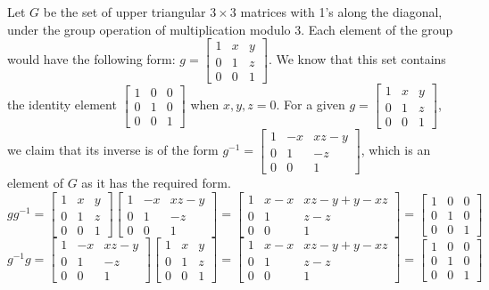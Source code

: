 \documentclass[12pt,letterpaper,reqno]{amsart}
\begin{document}
\begin{enumerate}
\begin{flushleft}
Let $G$ be the set of upper triangular $3 \times 3$ matrices with 1's along the diagonal, under the group operation of multiplication modulo 3. Each element of the group would have the following form: $g = \begin{bmatrix} 1 & x & y \\0 & 1 & z\\ 0 & 0 & 1 \end{bmatrix}$. We know that this set contains the identity element $\begin{bmatrix} 1 & 0 & 0 \\0 & 1 & 0\\ 0 & 0 & 1 \end{bmatrix}$ when $x, y, z = 0$.
\newline
For a given $g = \begin{bmatrix} 1 & x & y \\0 & 1 & z\\ 0 & 0 & 1 \end{bmatrix}$, we claim that its inverse is of the form $g^{-1} = \begin{bmatrix} 1 & -x & xz-y \\0 & 1 & -z\\ 0 & 0 & 1 \end{bmatrix}$, which is an element of $G$ as it has the required form.
$$gg^{-1} = \begin{bmatrix} 1 & x & y \\0 & 1 & z\\ 0 & 0 & 1 \end{bmatrix}\begin{bmatrix} 1 & -x & xz-y \\0 & 1 & -z\\ 0 & 0 & 1 \end{bmatrix} = \begin{bmatrix} 1 & x-x & xz-y+y-xz \\0 & 1 & z-z\\ 0 & 0 & 1 \end{bmatrix} = \begin{bmatrix} 1 & 0 & 0 \\0 & 1 & 0\\ 0 & 0 & 1 \end{bmatrix}$$
$$g^{-1}g = \begin{bmatrix} 1 & -x & xz-y \\0 & 1 & -z\\ 0 & 0 & 1 \end{bmatrix}\begin{bmatrix} 1 & x & y \\0 & 1 & z\\ 0 & 0 & 1 \end{bmatrix} = \begin{bmatrix} 1 & x-x & xz-y+y-xz \\0 & 1 & z-z\\ 0 & 0 & 1 \end{bmatrix} = \begin{bmatrix} 1 & 0 & 0 \\0 & 1 & 0\\ 0 & 0 & 1 \end{bmatrix}$$


\end{flushleft}
\end{enumerate}
\end{document}
